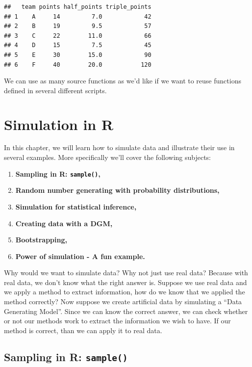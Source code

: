 \documentclass[
]{book}
\providecommand{\tightlist}{%
  \setlength{\itemsep}{0pt}\setlength{\parskip}{0pt}}
\theoremstyle{definition}
\theoremstyle{definition}
\theoremstyle{definition}
\theoremstyle{definition}
\theoremstyle{remark}
\begin{document}
\begin{verbatim}
##   team points half_points triple_points
## 1    A     14         7.0            42
## 2    B     19         9.5            57
## 3    C     22        11.0            66
## 4    D     15         7.5            45
## 5    E     30        15.0            90
## 6    F     40        20.0           120
\end{verbatim}

We can use as many source functions as we'd like if we want to reuse functions defined in several different scripts.

\hypertarget{simulation-in-r}{%
\chapter{Simulation in R}\label{simulation-in-r}}

In this chapter, we will learn how to simulate data and illustrate their use in several examples. More specifically we'll cover the following subjects:

\begin{enumerate}
\def\labelenumi{\arabic{enumi}.}
\tightlist
\item
  \textbf{Sampling in R: \texttt{sample()},}
\item
  \textbf{Random number generating with probability distributions,}
\item
  \textbf{Simulation for statistical inference,}
\item
  \textbf{Creating data with a DGM,}
\item
  \textbf{Bootstrapping,}
\item
  \textbf{Power of simulation - A fun example.}
\end{enumerate}

Why would we want to simulate data? Why not just use real data? Because with real data, we don't know what the right answer is. Suppose we use real data and we apply a method to extract information, how do we know that we applied the method correctly? Now suppose we create artificial data by simulating a ``Data Generating Model''. Since we can know the correct answer, we can check whether or not our methods work to extract the information we wish to have. If our method is correct, than we can apply it to real data.

\hypertarget{sampling-in-r-sample}{%
\section{\texorpdfstring{Sampling in R: \texttt{sample()}}{Sampling in R: sample()}}\label{sampling-in-r-sample}}
\end{document}

